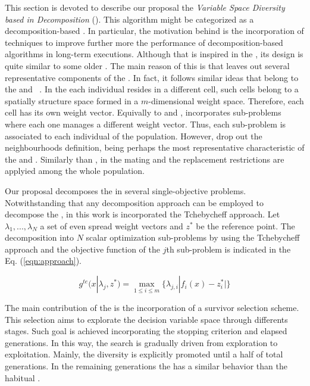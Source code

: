 This section is devoted to describe our proposal the \textit{Variable Space Diversity \MOEA{} based in Decomposition} (\VSDMOEAD{}).
%
This algorithm might be categorized as a decomposition-based \MOEA{}.
%
In particular, the motivation behind \VSDMOEAD{} is the incorporation of techniques to improve further more the performance of decomposition-based algorithms in long-term executions.
%
Although that \VSDMOEAD{} is inspired in the \MOEAD{}, its design is quite similar to some older \MOEAS{}.
%
The main reason of this is that \VSDMOEAD{} leaves out several representative components of the \MOEAD{}.
%
In fact, it follows similar ideas that belong to the \MOGA{} and \CMOGA{}~\cite{murata2002cellular}.
%
In the \CMOGA{} each individual resides in a different cell, such cells belong to a spatially structure space formed in a $m$-dimensional weight space.
%
Therefore, each cell has its own weight vector.
%
Equivally to \MOEAD{} and \CMOGA{}, \VSDMOEAD{} incorporates sub-problems where each one manages a different weight vector.
%
Thus, each sub-problem is associated to each individual of the population.
%
However, \VSDMOEAD{} drop out the neighbourhoods definition, being perhaps the most representative characteristic of the \CMOGA{} and \MOEAD{}.
%
Similarly than \MOGA{}, in \VSDMOEAD{} the mating and the replacement restrictions are applyied among the whole population.
%

Our proposal decomposes the \MOP{} in several single-objective problems.
%
Notwithstanding that any decomposition approach can be employed to decompose the \MOP{}, in this work is incorporated the Tchebycheff approach.
%
Let $\lambda_1, ..., \lambda_N$ a set of even spread weight vectors and $z^*$ be the reference point.
%
The decomposition into $N$ scalar optimization sub-problems by using the Tchebycheff approach and the objective function of the $j$th sub-problem is indicated in the Eq. (\ref{eqn:approach}).
%

\begin{equation}\label{eqn:approach}
\displaystyle{
g^{te}(x| \lambda_j, z^*) = \max_{ 1 \leq i \leq m} \{ \lambda_{j,i} | f_i(x) - z_i^*|\}
}
\end{equation}


The main contribution of the \VSDMOEAD{} is the incorporation of a survivor selection scheme.
%
This selection aims to explorate the decision variable space through differents stages.
%
Such goal is achieved incorporating the stopping criterion and elapsed generations.
%
In this way, the search is gradually driven from exploration to exploitation.
%
Mainly, the diversity is explicitly promoted until a half of total generations. 
%
In the remaining generations the \VSDMOEAD{} has a similar behavior than the habitual \MOEAS{}.
%

